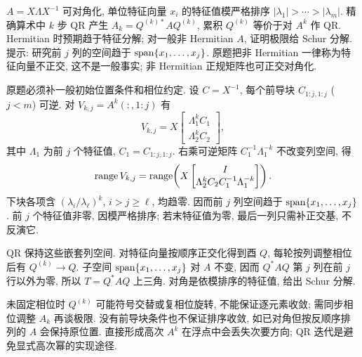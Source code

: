 \begin{exercise}\label{e2012:q3}
$A=X\Lambda X^{-1}$ 可对角化, 单位特征向量 $x_i$ 的特征值模严格排序 $|\lambda_1|>\cdots>|\lambda_m|$. 精确算术中 $k$ 步 QR 产生 $A_k=Q^{(k)*}AQ^{(k)}$, 累积 $Q^{(k)}$ 等价于对 $A^k$ 作 QR. Hermitian 时预期趋于特征分解; 对一般非 Hermitian $A$, 证明极限给 Schur 分解. 提示: 研究前 $j$ 列的空间趋于 $\operatorname{span}\{x_1,\ldots,x_j\}$. 原题把非 Hermitian 一律称为特征向量不正交, 这不是一般事实; 非 Hermitian 正规矩阵也可正交对角化.
\end{exercise}
\begin{solution}\label{sol:qr-flag}
原题必须补一般初始位置条件和相位约定. 设 $C=X^{-1}$, 每个前导块 $C_{1:j,1:j}$ ($j<m$) 可逆. 对 $V_{k,j}=A^k(:,1:j)$ 有
\[
 V_{k,j}=X\begin{bmatrix}\Lambda_1^kC_1\\\Lambda_2^kC_2\end{bmatrix},
\]
其中 $\Lambda_1$ 为前 $j$ 个特征值, $C_1=C_{1:j,1:j}$. 右乘可逆矩阵 $C_1^{-1}\Lambda_1^{-k}$ 不改变列空间, 得
\[
 \operatorname{range} V_{k,j}=\operatorname{range}\!\left(X\begin{bmatrix}I\\
 \Lambda_2^k C_2 C_1^{-1}\Lambda_1^{-k}\end{bmatrix}\right).
\]
下块各项含 $(\lambda_i/\lambda_\ell)^k$, $i>j\ge\ell$, 均趋零. 因而前 $j$ 列空间趋于 $\operatorname{span}\{x_1,\ldots,x_j\}$. 前 $j$ 个特征值非零, 因模严格排序; 若末特征值为零, 最后一列只需补正交基, 不反演它.

QR 保持这些嵌套列空间. 对特征向量按顺序正交化得到酉 $Q$, 每轮按列调整相位后有 $Q^{(k)}\to Q$. 子空间 $\operatorname{span}\{x_1,\ldots,x_j\}$ 对 $A$ 不变, 因而 $Q^*AQ$ 第 $j$ 列在前 $j$ 行以外为零, 所以 $T=Q^*AQ$ 上三角. 对角是依模排序的特征值, 给出 Schur 分解.

未固定相位时 $Q^{(k)}$ 可能符号交替或复相位旋转, 不能保证逐元素收敛; 需同步相位调整 $A_k$ 再谈极限. 没有前导块条件也不保证排序收敛, 如已对角但按反顺序排列的 $A$ 会保持原位置. 直接形成高次 $A^k$ 在浮点中会丢失次要方向; QR 迭代是避免显式高次幂的实现途径.
\end{solution}
